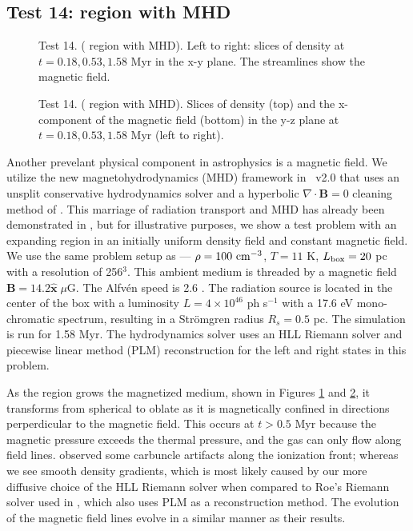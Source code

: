\documentclass[12pt,preprint]{aastex}
\begin{document}
\subsection{Test 14:  region with MHD}

\begin{figure}[t]
  \caption{\label{fig:test14_1} Test 14. ( region with MHD).
    Left to right: slices of density at $t = 0.18, 0.53, 1.58$ Myr in
    the x-y plane.  The streamlines show the magnetic field.}
\end{figure}

\begin{figure}[t]
  \caption{\label{fig:test14_2} Test 14. ( region with
    MHD). Slices of density (top) and the x-component of the magnetic
    field (bottom) in the y-z plane at $t = 0.18, 0.53, 1.58$ Myr
    (left to right).}
\end{figure}

Another prevelant physical component in astrophysics is a magnetic
field.  We utilize the new magnetohydrodynamics (MHD) framework
\citep{Wang09} in \enzo~v2.0 that uses an unsplit conservative
hydrodynamics solver and a hyperbolic $\nabla \cdot \mathbf{B} = 0$
cleaning method of \citet{Dedner02}.  This marriage of radiation
transport and MHD has already been demonstrated in \citet{Wang10}, but
for illustrative purposes, we show a test problem with an expanding
 region in an initially uniform density field and constant
magnetic field.  We use the same problem setup as
\citet{Krumholz07_ART} --- $\rho = 100~\cubecm$, $T = 11$ K, $L_{\rm
  box} = 20$ pc with a resolution of 256$^3$.  This ambient medium is
threaded by a magnetic field $\mathbf{B} = 14.2 \hat{\mathbf{x}} \;
\mu\mathrm{G}$.  The Alfv\'{e}n speed is 2.6 \kms.  The radiation
source is located in the center of the box with a luminosity $L = 4
\times 10^{46}$ ph s$^{-1}$ with a 17.6 eV mono-chromatic spectrum,
resulting in a Str\"{o}mgren radius $R_s = 0.5$ pc.  The simulation is
run for 1.58 Myr.  The hydrodynamics solver uses an HLL Riemann solver
\citep{HLL} and piecewise linear method (PLM) reconstruction
\citep{PLM} for the left and right states in this problem.

As the  region grows the magnetized medium, shown in Figures
\ref{fig:test14_1} and \ref{fig:test14_2}, it transforms from
spherical to oblate as it is magnetically confined in directions
perperdicular to the magnetic field.  This occurs at $t > 0.5$ Myr
because the magnetic pressure exceeds the thermal pressure, and the
gas can only flow along field lines.  \citeauthor{Krumholz07_ART}
observed some carbuncle artifacts along the ionization front; whereas
we see smooth density gradients, which is most likely caused by our
more diffusive choice of the HLL Riemann solver when compared to Roe's
Riemann solver used in \citet{Krumholz07_ART}, which also uses PLM as
a reconstruction method.  The evolution of the magnetic field lines
evolve in a similar manner as their results.
\end{document}

